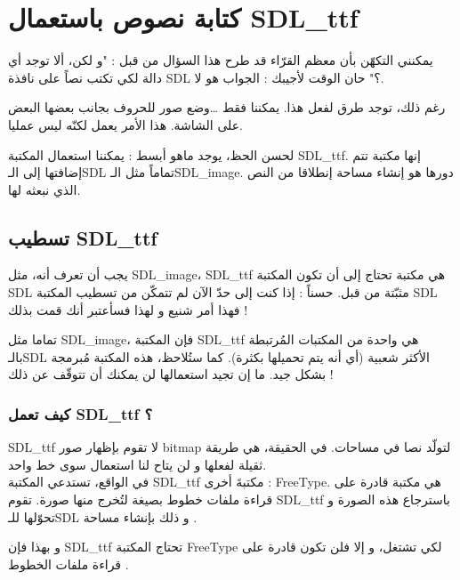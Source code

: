\chapter{كتابة نصوص باستعمال \textenglish{SDL\_ttf}}

يمكنني التكهّن بأن معظم القرّاء قد طرح هذا السؤال من قبل : "و لكن، ألا توجد أي دالة لكي تكتب نصاً على نافذة
\textenglish{SDL} ؟"
حان الوقت لأجيبك : الجواب هو لا.

رغم ذلك، توجد طرق لفعل هذا. يمكننا فقط \dots وضع صور للحروف بجانب بعضها البعض على الشاشة. هذا الأمر يعمل لكنّه ليس عمليا.

لحسن الحظ، يوجد ماهو أبسط : يمكننا استعمال المكتبة
\textenglish{SDL\_ttf}.
إنها مكتبة تتم إضافتها إلى الـ\textenglish{SDL}
تماماً مثل الـ\textenglish{SDL\_image}.
دورها هو إنشاء مساحة
إنطلاقا من النص الذي نبعثه لها.

\section{تسطيب \textenglish{SDL\_ttf}}

يجب أن تعرف أنه، مثل
\textenglish{SDL\_image}، \textenglish{SDL\_ttf}
هي مكتبة تحتاج إلى أن تكون المكتبة
\textenglish{SDL}
مثبّتة من قبل. حسناً : إذا كنت إلى حدّ الآن لم تتمكّن من تسطيب المكتبة
\textenglish{SDL}
فهذا أمر شنيع و لهذا فسأعتبر أنك قمت بذلك !

تماما مثل 
\textenglish{SDL\_image}،
فإن المكتبة 
\textenglish{SDL\_ttf}
هي واحدة من المكتبات المُرتبطة بالـ\textenglish{SDL}
الأكثر شعبية (أي أنه يتم تحميلها بكثرة). كما ستُلاحظ، هذه المكتبة مُبرمجة بشكل جيد. ما إن تجيد استعمالها لن يمكنك أن تتوقّف عن ذلك !

\subsection{كيف تعمل \textenglish{SDL\_ttf} ؟}

\textenglish{SDL\_ttf}
لا تقوم بإظهار صور 
\textenglish{bitmap}
لتولّد نصا في مساحات. في الحقيقة، هي طريقة ثقيلة لفعلها و لن يتاح لنا استعمال سوى خط واحد. \\
في الواقع، تستدعي المكتبة
\textenglish{SDL\_ttf}
مكتبةَ أخرى : 
\textenglish{FreeType}.
هي مكتبة قادرة على قراءة ملفات خطوط بصيغة
لتُخرج منها صورة. تقوم
\textenglish{SDL\_ttf}
باسترجاع هذه الصورة و تحوّلها للـ\textenglish{SDL}
و ذلك بإنشاء مساحة
.

و بهذا فإن
\textenglish{SDL\_ttf}
تحتاج المكتبة
\textenglish{FreeType}
لكي تشتغل، و إلا فلن تكون قادرة على قراءة ملفات الخطوط
.

